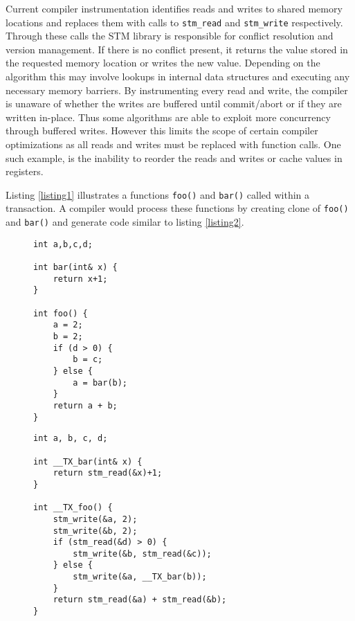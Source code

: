 \documentclass[preprint]{sigplanconf}
\begin{document}
Current compiler instrumentation identifies reads and writes to shared memory locations and replaces them with calls to \verb+stm_read+ and \verb+stm_write+ respectively. Through these calls the STM library is responsible for conflict resolution and version management. If there is no conflict present, it returns the value stored in the requested memory location or writes the new value. Depending on the algorithm this may involve lookups in internal data structures and executing any necessary memory barriers. By instrumenting every read and write, the compiler is unaware of whether the writes are buffered until commit/abort or if they are written in-place. Thus some algorithms are able to exploit more concurrency through buffered writes. However this limits the scope of certain compiler optimizations as all reads and writes must be replaced with function calls. One such example, is the inability to reorder the reads and writes or cache values in registers.

Listing \ref{listing1} illustrates a functions \verb+foo()+ and \verb+bar()+ called within a transaction. A compiler would process these functions by creating clone of \verb+foo()+ and \verb+bar()+ and generate code similar to listing \ref{listing2}.

\begin{figure}[h]
    \begin{lstlisting}[caption={Example},label=listing1,captionpos=b]
int a,b,c,d;

int bar(int& x) {
    return x+1;
}

int foo() {
    a = 2;
    b = 2;
    if (d > 0) {
        b = c;
    } else {
        a = bar(b);
    }
    return a + b;
}
\end{lstlisting}
\end{figure}
\noindent

\begin{figure}[h]
    \begin{lstlisting}[caption={Standard STM instrumentation},label=listing2,captionpos=b]
int a, b, c, d;

int __TX_bar(int& x) {
    return stm_read(&x)+1;
}

int __TX_foo() {
    stm_write(&a, 2);
    stm_write(&b, 2);
    if (stm_read(&d) > 0) {
        stm_write(&b, stm_read(&c));
    } else {
        stm_write(&a, __TX_bar(b));
    }
    return stm_read(&a) + stm_read(&b);
}
\end{lstlisting}
\end{figure}
\end{document}
